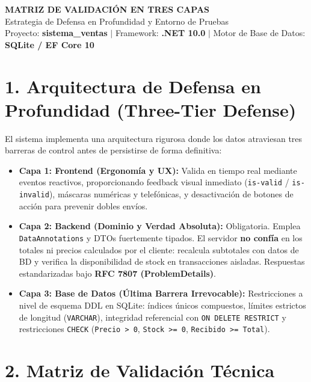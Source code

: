 \documentclass[10pt,a4paper,landscape]{article}
\begin{document}
\begin{center}
    {\LARGE\bfseries\color{primary} MATRIZ DE VALIDACIÓN EN TRES CAPAS}\\[0.3em]
    {\large\color{secondary} Estrategia de Defensa en Profundidad y Entorno de Pruebas}\\[0.2em]
    {\footnotesize\color{gray} Proyecto: \textbf{sistema\_ventas} $|$ Framework: \textbf{.NET 10.0} $|$ Motor de Base de Datos: \textbf{SQLite / EF Core 10}}
\end{center}
\vspace{0.8em}

\section*{1. Arquitectura de Defensa en Profundidad (Three-Tier Defense)}
El sistema implementa una arquitectura rigurosa donde los datos atraviesan tres barreras de control antes de persistirse de forma definitiva:

\begin{itemize}[leftmargin=1.5em, itemsep=0.1em]
    \item \textbf{Capa 1: Frontend (Ergonomía y UX):} Valida en tiempo real mediante eventos reactivos, proporcionando feedback visual inmediato (\texttt{is-valid} / \texttt{is-invalid}), máscaras numéricas y telefónicas, y desactivación de botones de acción para prevenir dobles envíos.
    \item \textbf{Capa 2: Backend (Dominio y Verdad Absoluta):} Obligatoria. Emplea \texttt{DataAnnotations} y DTOs fuertemente tipados. El servidor \textbf{no confía} en los totales ni precios calculados por el cliente: recalcula subtotales con datos de BD y verifica la disponibilidad de stock en transacciones aisladas. Respuestas estandarizadas bajo \textbf{RFC 7807 (ProblemDetails)}.
    \item \textbf{Capa 3: Base de Datos (Última Barrera Irrevocable):} Restricciones a nivel de esquema DDL en SQLite: índices únicos compuestos, límites estrictos de longitud (\texttt{VARCHAR}), integridad referencial con \texttt{ON DELETE RESTRICT} y restricciones \texttt{CHECK} (\texttt{Precio > 0}, \texttt{Stock >= 0}, \texttt{Recibido >= Total}).
\end{itemize}

\vspace{0.8em}

\section*{2. Matriz de Validación Técnica}
\end{document}
